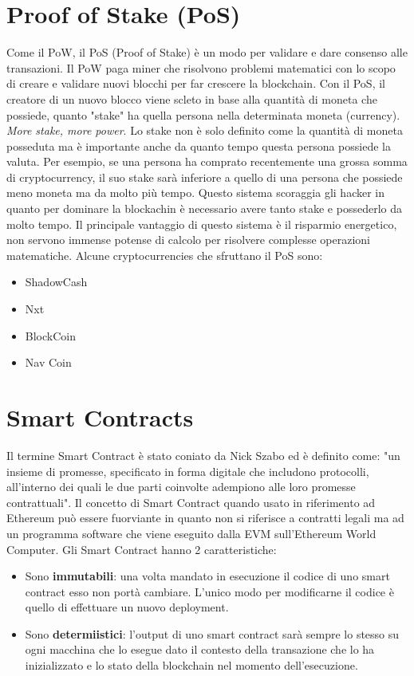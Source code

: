 \section{Proof of Stake (PoS)}
Come il PoW, il PoS (Proof of Stake) è un modo per validare e dare consenso alle
transazioni. Il PoW paga miner che risolvono problemi matematici con lo scopo di
creare e validare nuovi blocchi per far crescere la blockchain.
Con il PoS, il creatore  di un nuovo blocco viene scleto in base alla quantità
di moneta che possiede, quanto "stake" ha quella persona nella determinata moneta
(currency). \textit{More stake, more power}.
Lo stake non è solo definito come la quantità di moneta posseduta ma è importante
anche da quanto tempo questa persona possiede la valuta.
Per esempio, se una persona ha comprato recentemente una grossa somma di
cryptocurrency, il suo stake sarà inferiore a quello di una persona che possiede
meno moneta ma da molto più tempo.
Questo sistema scoraggia gli hacker in quanto per dominare la blockachin è
necessario avere tanto stake e possederlo da molto tempo.
Il principale vantaggio di questo sistema è il risparmio energetico,
non servono immense potense di calcolo per risolvere complesse operazioni matematiche.
Alcune cryptocurrencies che sfruttano il PoS sono:

\begin{itemize}
      \item ShadowCash
      \item Nxt
      \item BlockCoin
      \item Nav Coin
\end{itemize}

\section{Smart Contracts}

Il termine Smart Contract è stato coniato da Nick Szabo ed è definito come:
"un insieme di promesse, specificato in forma digitale che includono protocolli,
all'interno dei quali le due parti coinvolte adempiono alle loro promesse
contrattuali".
Il concetto di Smart Contract quando usato in riferimento ad Ethereum può essere
fuorviante in quanto
non si riferisce a contratti legali ma ad un programma software che viene eseguito
dalla EVM sull'Ethereum
World Computer. Gli Smart Contract hanno 2 caratteristiche:

\begin{itemize}
      \item Sono \textbf{immutabili}: una volta mandato in esecuzione il
            codice di uno smart contract esso non portà cambiare.
            L'unico modo per modificarne il codice è quello di effettuare un
            nuovo deployment.
      \item Sono \textbf{determiistici}: l'output di uno smart contract sarà
            sempre lo stesso su ogni macchina che lo esegue dato il contesto della
            transazione che lo ha inizializzato e lo stato della blockchain nel momento
            dell'esecuzione.
\end{itemize}

